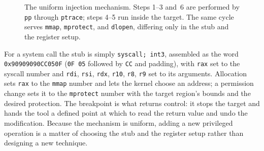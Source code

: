 \documentclass[10pt,twocolumn,a4paper]{article}
\newcommand{\dstyles}{%
  \tikzset{%
    pstep/.style={draw, rounded corners, fill=black!4, align=left,
      inner sep=5pt, font=\footnotesize, text width=6.2cm},
    flow/.style={->, >=latex, thick},
    memblock/.style={draw, align=left, inner sep=5pt,
      font=\footnotesize\ttfamily, fill=black!3},
  }%
}
\begin{document}
\begin{figure}[t]
\centering
{}
\caption{The uniform injection mechanism. Steps 1--3 and~6 are performed by
\texttt{pp} through \texttt{ptrace}; steps 4--5 run inside the target. The same
cycle serves \texttt{mmap}, \texttt{mprotect}, and \texttt{dlopen}, differing
only in the stub and the register setup.}
\label{fig:inject}
\end{figure}

For a system call the stub is simply \texttt{syscall; int3}, assembled as the
word \texttt{0x90909090CC050F} (\texttt{0F 05} followed by \texttt{CC} and
padding), with \texttt{rax} set to the syscall number and \texttt{rdi},
\texttt{rsi}, \texttt{rdx}, \texttt{r10}, \texttt{r8}, \texttt{r9} set to its
arguments. Allocation sets \texttt{rax} to the \texttt{mmap} number and lets the
kernel choose an address; a permission change sets it to the \texttt{mprotect}
number with the target region's bounds and the desired protection. The breakpoint
is what returns control: it stops the target and hands the tool a defined point at
which to read the return value and undo the modification. Because the mechanism
is uniform, adding a new privileged operation is a matter of choosing the stub and
the register setup rather than designing a new technique.
\end{document}
